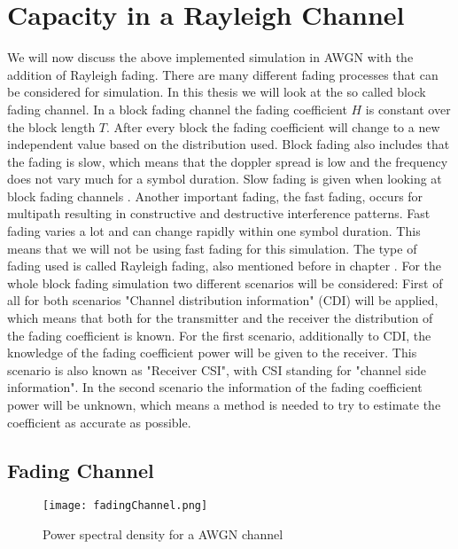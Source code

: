 \chapter{Capacity in a Rayleigh Channel} 
\label{chap:raychan}
\graphicspath{{C:/Users/Kevin/Bachelarbeit/Bachelorarbeit/01_Bachelorarbeit_LaTex/02_Figures/}}


We will now discuss the above implemented simulation in AWGN with the addition of Rayleigh fading. 
There are many different fading processes that can be considered for simulation. In this thesis we will look at the so called block fading channel. In a block fading channel the fading coefficient $H$ is constant over the block length $T$. After every block the fading coefficient will change to a new independent value based on the distribution used. Block fading also includes that the fading is slow, which means that the doppler spread is low and the frequency does not vary much for a symbol duration. Slow fading is given when looking at block fading channels \cite[p.~102]{Goldsmith08}. Another important fading, the fast fading, occurs for multipath resulting in constructive and destructive interference patterns. Fast fading varies a lot and can change rapidly within one symbol duration. This means that we will not be using fast fading for this simulation.
The type of fading used is called Rayleigh fading, also mentioned before in chapter . For the whole block fading simulation two different scenarios will be considered:
\newline
First of all for both scenarios "Channel distribution information" (CDI) will be applied, which means that both for the transmitter and the receiver the distribution of the fading coefficient is known. For the first scenario, additionally to CDI, the knowledge of the fading coefficient power will be given to the receiver. This scenario is also known as "Receiver CSI", with CSI standing for "channel side information".
\newline
In the second scenario the information of the fading coefficient power will be unknown, which means a method is needed to try to estimate the coefficient as accurate as possible. 
\clearpage 
\section{Fading Channel}
\begin{figure}[!htb]
	\centering
	\texttt{[image: fadingChannel.png]}
	\caption{Power spectral density for a AWGN channel}
	\label{fig:AWGN}
\end{figure}

